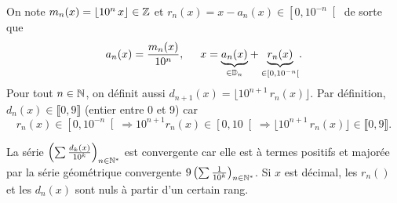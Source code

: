 \begin{nota}
 On note $m_n(x) = \lfloor 10^n\, x\rfloor \in \mathbb{Z}$ et $r_n(x) = x - a_n(x) \in \left[ 0, 10^{-n}\right[$ de sorte que 
\[
 a_n(x) = \frac{m_n(x)}{10^n}, \hspace{0.5cm} x = \underset{\in \mathbb{D}_n}{\underbrace{a_n(x)}} + \underset{\in \left[ 0, 10^{-n}\right[ }{\underbrace{r_n(x)}}.
\]
Pour tout $n\in \mathbb{N}$, on définit aussi $d_{n+1}(x) = \lfloor 10^{n+1}\,r_n(x) \rfloor$. 
Par définition, $d_n(x) \in \llbracket 0, 9\rrbracket$ (entier entre 0 et 9) car 
\[
 r_n(x) \in \left[ 0, 10^{-n}\right[ \Rightarrow 10^{n+1}r_n(x) \in \left[ 0, 10\right[
 \Rightarrow \lfloor 10^{n+1}\,r_n(x) \rfloor  \in \llbracket 0, 9\rrbracket.
\]
\end{nota}
\begin{rems}
 La série $\left( \sum \frac{d_k(x)}{10^k} \right)_{n \in \mathbb{N}^*}$ est convergente car elle est à termes positifs et majorée par la série géométrique convergente $9\left( \sum \frac{1}{10^k} \right)_{n \in \mathbb{N}^*}$.\newline
 Si $x$ est décimal, les $r_n()$ et les $d_n(x)$ sont nuls à partir d'un certain rang.
\end{rems}

